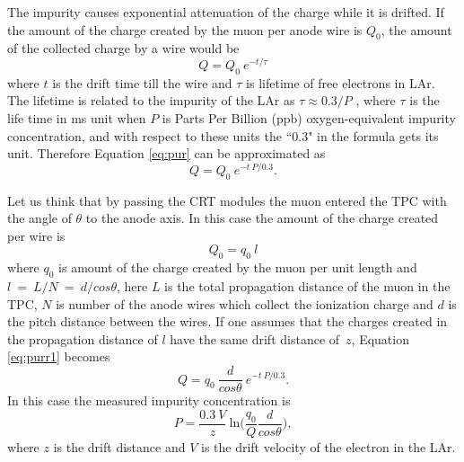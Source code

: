 \documentclass[a4paper]{article}\linespread{1.4}
\begin{document}
The impurity causes exponential attenuation of the charge while it is drifted. 
If the amount of the charge created by the muon per anode wire is $Q_{0}$, the amount of the collected charge by a wire 
would be 
\begin{equation}  Q = Q_{0} \ e^{-t/ \tau}  \label{eq:pur} \end{equation}
where $t$ is the drift time till the wire and $\tau$ is lifetime of free electrons in LAr. The lifetime is related to the impurity of the LAr as $\tau\approx0.3/P$ \cite{larpur}, where $\tau$ is the life time in ms unit when $P$ is Parts Per Billion (ppb) oxygen-equivalent impurity concentration, and with respect to these units the ``0.3" in the formula gets its unit. Therefore Equation \ref{eq:pur} can be approximated as
\begin{equation}  Q = Q_{0} \ e^{-t~P/ 0.3}  \label{eq:purr1}. \end{equation}

Let us think that by passing the CRT modules the muon entered the TPC with the angle of $\theta$ to the anode axis. 
In this case the amount of the charge created per wire is 
\begin{equation} Q_{0}=q_{0}~l \end{equation} where $q_{0}$ is amount of the charge  created by the muon per unit length and $l~=~L/N~=~d/cos\theta$, here $L$ is the total propagation distance of the muon in the TPC, $N$ is number of the anode wires which collect the ionization charge and $d$ is the pitch distance between the wires. 
If one assumes that the charges created in the propagation distance of $l$ have the same drift distance of~$z$, Equation \ref{eq:purr1} becomes
\begin{equation} Q = q_{0}~\frac{d}{cos\theta}~e^{-t~P/ 0.3}.\end{equation} 
In this case the measured impurity concentration is
\begin{equation} P = \frac{0.3~V}{z}~\mathrm{ln}\Big(\frac{q_{0}}{Q} \frac{d}{cos\theta}\Big), \label{eq:ppb}\end{equation} 
where $z$ is the drift distance and $V$ is the drift velocity of the electron in the LAr.
\end{document}
